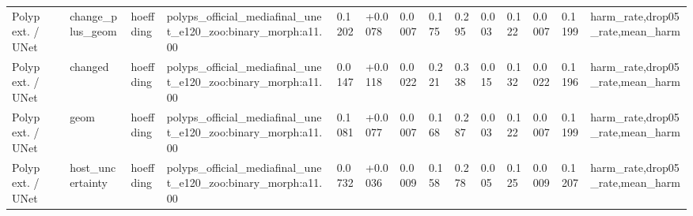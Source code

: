 \begin{table}[t]
\begin{tabular}{llllllllllllll}
Polyp ext. / UNet & change\_plus\_geom & hoeffding & polyps\_official\_mediafinal\_unet\_e120\_zoo:binary\_morph:a11.00 & 0.1202 & +0.0078 & 0.0007 & 0.175 & 0.295 & 0.003 & 0.122 & 0.0007 & 0.1199 & harm\_rate,drop05\_rate,mean\_harm \\
Polyp ext. / UNet & changed & hoeffding & polyps\_official\_mediafinal\_unet\_e120\_zoo:binary\_morph:a11.00 & 0.0147 & +0.0118 & 0.0022 & 0.221 & 0.338 & 0.015 & 0.132 & 0.0022 & 0.1196 & harm\_rate,drop05\_rate,mean\_harm \\
Polyp ext. / UNet & geom & hoeffding & polyps\_official\_mediafinal\_unet\_e120\_zoo:binary\_morph:a11.00 & 0.1081 & +0.0077 & 0.0007 & 0.168 & 0.287 & 0.003 & 0.122 & 0.0007 & 0.1199 & harm\_rate,drop05\_rate,mean\_harm \\
Polyp ext. / UNet & host\_uncertainty & hoeffding & polyps\_official\_mediafinal\_unet\_e120\_zoo:binary\_morph:a11.00 & 0.0732 & +0.0036 & 0.0009 & 0.158 & 0.278 & 0.005 & 0.125 & 0.0009 & 0.1207 & harm\_rate,drop05\_rate,mean\_harm \\
\bottomrule
\end{tabular}
\end{table}
